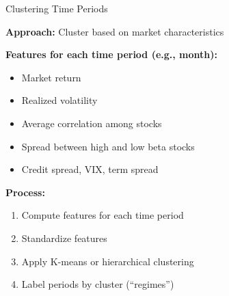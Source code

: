 \documentclass[10pt]{beamer}
\begin{document}
\begin{frame}{Clustering Time Periods}

  \textbf{Approach:} Cluster based on market characteristics

  \vspace{1em}
  \textbf{Features for each time period (e.g., month):}
  \begin{itemize}
    \item Market return
    \item Realized volatility
    \item Average correlation among stocks
    \item Spread between high and low beta stocks
    \item Credit spread, VIX, term spread
  \end{itemize}

  \vspace{1em}
  \textbf{Process:}
  \begin{enumerate}
    \item Compute features for each time period
    \item Standardize features
    \item Apply K-means or hierarchical clustering
    \item Label periods by cluster (``regimes'')
  \end{enumerate}
\end{frame}

\end{document}
